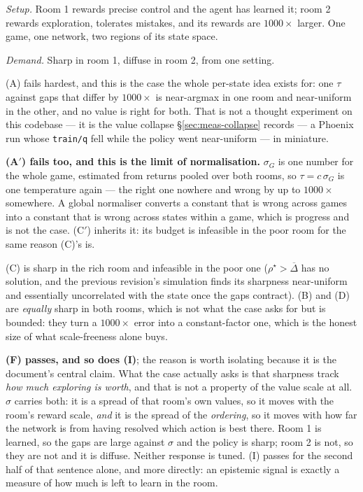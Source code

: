 \documentclass{article}
\newcommand{\gapbar}{\overline{\Delta}}
\newcommand{\srank}{\sigma}
\newcommand{\snorm}{\sigma_{G}}
\begin{document}
\emph{Setup.} Room 1 rewards precise control and the agent has learned it; room 2 rewards
exploration, tolerates mistakes, and its rewards are $1000\times$ larger. One game, one network,
two regions of its state space.

\emph{Demand.} Sharp in room 1, diffuse in room 2, from one setting.

(A) fails hardest, and this is the case the whole per-state idea exists for: one $\tau$ against
gaps that differ by $1000\times$ is near-argmax in one room and near-uniform in the other, and no
value is right for both. That is not a thought experiment on this codebase --- it is the
value collapse \S\ref{sec:meas-collapse} records --- a Phoenix run whose \texttt{train/q} fell
while the policy went near-uniform --- in miniature.

\textbf{(A$'$) fails too, and this is the limit of normalisation.} $\snorm$ is one number for
the whole game, estimated from returns pooled over both rooms, so $\tau = c\,\snorm$ is one
temperature again --- the right one nowhere and wrong by up to $1000\times$ somewhere. A global
normaliser converts a constant that is wrong across games into a constant that is wrong across
states within a game, which is progress and is not the case. (C$'$) inherits it: its budget is
infeasible in the poor room for the same reason (C)'s is.

(C) is sharp in the rich room and infeasible in the poor one ($\rho^\star > \gapbar$ has no
solution, and the previous revision's simulation finds its sharpness near-uniform and
essentially uncorrelated with the state once the gaps contract). (B) and (D) are \emph{equally}
sharp in both rooms, which is not what the case asks for but is bounded: they turn a
$1000\times$ error into a constant-factor one, which is the honest size of what scale-freeness
alone buys.

\textbf{(F) passes, and so does (I)}; the reason is worth isolating because it is the document's
central claim. What the case actually asks is that sharpness track \emph{how much exploring is
worth}, and that is not a property of the value scale at all. $\srank$ carries both: it is a
spread of that room's own values, so it moves with the room's reward scale, \emph{and} it is the
spread of the \emph{ordering}, so it moves with how far the network is from having resolved which
action is best there. Room 1 is learned, so the gaps are large against $\srank$ and the policy is
sharp; room 2 is not, so they are not and it is diffuse. Neither response is tuned. (I) passes
for the second half of that sentence alone, and more directly: an epistemic signal is exactly a
measure of how much is left to learn in the room.
\end{document}
